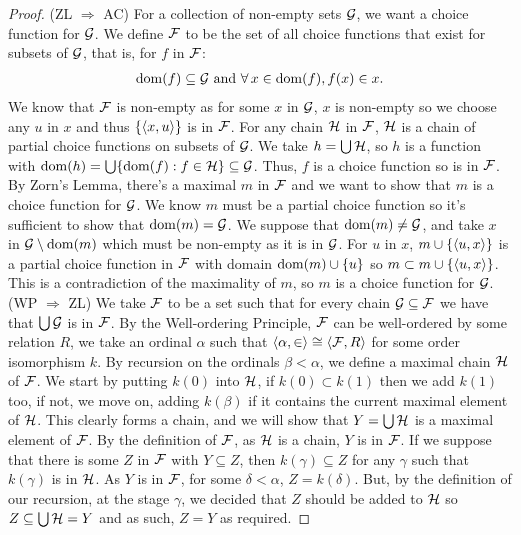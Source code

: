 \begin{proof}
    (ZL $\Longrightarrow$ AC) For a collection of non-empty sets $\mathcal{G}$,
    we want a choice function for $\mathcal{G}$. We define $\mathcal{F}$ to be
    the set of all choice functions that exist for subsets of $\mathcal{G}$,
    that is, for $f$ in $\mathcal{F}$: \begin{align*}
        \operatorname{dom}(f) \subseteq \mathcal{G} \text{ and } 
        \forall \, x \in \operatorname{dom}(f), f(x) \in x.
    \end{align*} We know that $\mathcal{F}$ is non-empty as for some
    $x$ in $\mathcal{G}$, $x$ is non-empty so we choose any $u$ in $x$
    and thus $\{{\langle x, u \rangle}\}$ is in $\mathcal{F}$. For any chain $\mathcal{H}$ in
    $\mathcal{F}$, $\mathcal{H}$ is a chain of partial choice functions on subsets
    of $\mathcal{G}$. We take $h = \bigcup \mathcal{H}$, so $h$ is a function
    with $\operatorname{dom}(h) = \bigcup \{\operatorname{dom}(f) : f \in \mathcal{H}\} \subseteq \mathcal{G}$.
    Thus, $f$ is a choice function so is in $\mathcal{F}$.
    \\[\baselineskip]
    By Zorn's Lemma, there's a maximal $m$ in $\mathcal{F}$ and we want
    to show that $m$ is a choice function for $\mathcal{G}$. We know
    $m$ must be a partial choice function so it's sufficient to
    show that $\operatorname{dom}(m) = \mathcal{G}$. We suppose that $\operatorname{dom}(m) \neq \mathcal{G}$,
    and take $x$ in $\mathcal{G} \setminus \operatorname{dom}(m)$ which must be non-empty
    as it is in $\mathcal{G}$. For $u$ in $x$, $m \cup \{{\langle u, x \rangle}\}$
    is a partial choice function in $\mathcal{F}$ with domain
    $\operatorname{dom}(m) \cup \{u\}$ so $m \subset m \cup \{{\langle u, x \rangle}\}$.
    This is a contradiction of the maximality of $m$, 
    so $m$ is a choice function for $\mathcal{G}$.
    \\[\baselineskip]
    (WP $\Longrightarrow$ ZL) We take $\mathcal{F}$ to be a set such that
    for every chain $\mathcal{G} \subseteq \mathcal{F}$ we have that 
    $\bigcup \mathcal{G}$ is in $\mathcal{F}$. By the Well-ordering Principle,
    $\mathcal{F}$ can be well-ordered by some relation $R$, we take
    an ordinal $\alpha$ such that ${\langle \alpha, \in \rangle} \cong {\langle \mathcal{F}, R \rangle}$
    for some order isomorphism $k$. By recursion on the ordinals 
    $\beta < \alpha$, we define a maximal chain $\mathcal{H}$ of $\mathcal{F}$.
    We start by putting $k(0)$ into $\mathcal{H}$, if $k(0) \subset k(1)$
    then we add $k(1)$ too, if not, we move on, adding $k(\beta)$
    if it contains the current maximal element of $\mathcal{H}$. This
    clearly forms a chain, and we will show that $Y = \bigcup \mathcal{H}$ is
    a maximal element of $\mathcal{F}$. By the definition of $\mathcal{F}$, 
    as $\mathcal{H}$ is a chain, $Y$ is in $\mathcal{F}$. If we suppose that there
    is some $Z$ in $\mathcal{F}$ with $Y \subseteq Z$, then $k(\gamma)
    \subseteq Z$ for any $\gamma$ such that $k(\gamma)$ is in $\mathcal{H}$.
    As $Y$ is in $\mathcal{F}$, for some $\delta < \alpha$, $Z = k(\delta)$.
    But, by the definition of our recursion, at the stage $\gamma$, we
    decided that $Z$ should be added to $\mathcal{H}$ so 
    $Z \subseteq \bigcup \mathcal{H} = Y$ and as such, $Z = Y$
    as required.
\end{proof}

